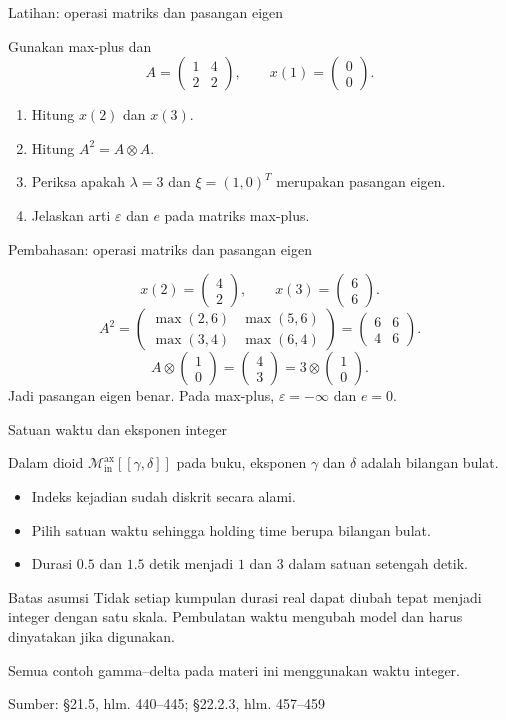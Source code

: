 \documentclass[aspectratio=169,11pt]{beamer}
\newcommand{\source}[1]{%
    \vfill
    \hfill{\tiny\color{gray}Sumber: #1}
}
\newcommand{\eps}{\varepsilon}
\newcommand{\D}{\mathcal{M}_{\mathrm{in}}^{\mathrm{ax}}[[\gamma,\delta]]}
\newcommand{\mpmat}[1]{\begin{pmatrix}#1\end{pmatrix}}
\begin{document}
\begin{frame}{Latihan: operasi matriks dan pasangan eigen}


Gunakan max-plus dan
\[
A=\mpmat{1&4\\2&2},\qquad x(1)=\mpmat{0\\0}.
\]
\begin{enumerate}
\item Hitung $x(2)$ dan $x(3)$.
\item Hitung $A^2=A\otimes A$.
\item Periksa apakah $\lambda=3$ dan $\xi=(1,0)^T$ merupakan pasangan eigen.
\item Jelaskan arti $\eps$ dan $e$ pada matriks max-plus.
\end{enumerate}
 


\end{frame}
\begin{frame}{Pembahasan: operasi matriks dan pasangan eigen}


\[
x(2)=\mpmat{4\\2},\qquad
x(3)=\mpmat{6\\6}.
\]
\[
A^2=\mpmat{\max(2,6)&\max(5,6)\\
\max(3,4)&\max(6,4)}
=\mpmat{6&6\\4&6}.
\]
\[
A\otimes\mpmat{1\\0}=\mpmat{4\\3}
=3\otimes\mpmat{1\\0}.
\]
Jadi pasangan eigen benar. Pada max-plus, $\eps=-\infty$ dan $e=0$.


\end{frame}
\begin{frame}{Satuan waktu dan eksponen integer}

Dalam dioid $\D$ pada buku, eksponen $\gamma$ dan $\delta$ adalah bilangan bulat.
\begin{itemize}
\item Indeks kejadian sudah diskrit secara alami.
\item Pilih satuan waktu sehingga holding time berupa bilangan bulat.
\item Durasi $0.5$ dan $1.5$ detik menjadi $1$ dan $3$ dalam satuan setengah detik.
\end{itemize}
\begin{block}{Batas asumsi}
Tidak setiap kumpulan durasi real dapat diubah tepat menjadi integer dengan satu skala.
Pembulatan waktu mengubah model dan harus dinyatakan jika digunakan.
\end{block}
Semua contoh gamma--delta pada materi ini menggunakan waktu integer.

\source{\S21.5, hlm. 440--445; \S22.2.3, hlm. 457--459}
\end{frame}
\end{document}
